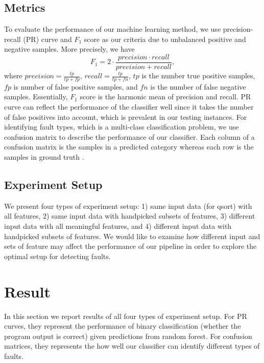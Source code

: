 \subsection{Metrics}
To evaluate the performance of our machine learning method, we use precision-recall (PR) curve and $F_1$ score as our criteria due to unbalanced positive and negative samples. More precisely, we have
\begin{equation}
F_{1} = 2\cdot\frac{precision \cdot recall}{precision + recall},
\end{equation}
where $precision = \frac{tp}{tp+fp}$, $recall = \frac{tp}{tp+fn}$, $tp$ is the number true positive samples, $fp$ is number of false positive samples, and $fn$ is the number of false negative samples. Essentially, $F_1$ score is the harmonic mean of precision and recall. PR curve can reflect the performance of the classifier well since it takes the number of false positives into account, which is prevalent in our testing instances. For identifying fault types, which is a multi-class classification problem, we use confusion matrix to describe the performance of our classifier. Each column of a confusion matrix is the samples in a predicted category whereas each row is the samples in ground truth \cite{powers2011evaluation}.

\subsection{Experiment Setup}
We present four types of experiment setup: 1) same input data (for qsort) with all features, 2) same input data with handpicked subsets of features, 3) different input data with all meaningful features, and 4) different input data with handpicked subsets of features. We would like to examine how different input and sets of feature  may affect the performance of our pipeline in order to explore the optimal setup for detecting faults.

\section{Result}
In this section we report results of all four types of experiment setup. For PR curves, they represent the performance of binary classification (whether the program output is correct) given predictions from random forest. For confusion matrices, they represents the how well our classifier can identify different types of faults.

